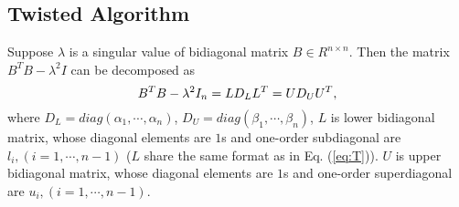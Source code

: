 \vspace{-0.15in}
\subsection{Twisted Algorithm}
\vspace{-0.1in}

Suppose $\lambda$ is a singular value of bidiagonal matrix $B \in R^{n \times n}$.
Then the matrix $B^T B - \lambda^2 I$ can be decomposed as
\begin{equation}
\vspace{-0.05in}
B^T B - \lambda^2 I_n = L D_L L^T = U D_U U^T ,
\vspace{-0.05in}
\end{equation}
where $D_L=diag(\alpha_1, \cdots, \alpha_n)$, $D_U = diag(\beta_1, \cdots, \beta_n)$, 
$L$ is lower bidiagonal matrix, whose diagonal elements are $1$s and one-order subdiagonal are $l_{i}, (i=1,\cdots,n-1)$ ($L$ share the same format as in Eq. (\ref{eq:T})).
$U$ is upper bidiagonal matrix, whose diagonal elements are $1$s and one-order superdiagonal are $u_{i}, (i=1,\cdots,n-1)$. 

